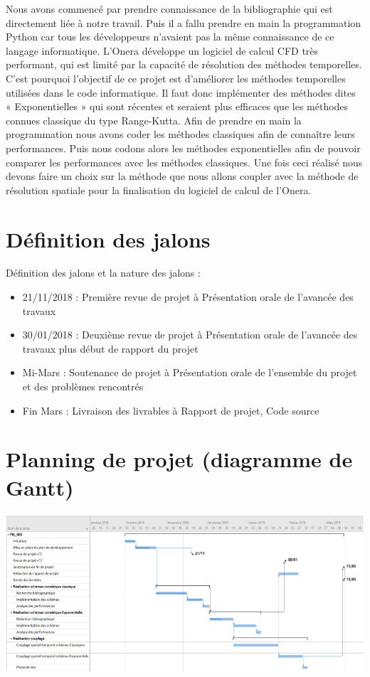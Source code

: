 \documentclass[a4paper,12pt]{report}
\theoremstyle{break}
\begin{document}
    Nous avons commencé par prendre connaissance de la bibliographie qui est directement liée à notre travail. Puis il a fallu prendre en main la programmation Python car tous les développeurs n’avaient pas la même connaissance de ce langage informatique. L’Onera développe un logiciel de calcul CFD très performant, qui est limité par la capacité de résolution des méthodes temporelles. C’est pourquoi l’objectif de ce projet est d’améliorer les méthodes temporelles utilisées dans le code informatique. Il faut donc implémenter des méthodes dites « Exponentielles » qui sont récentes et seraient plus efficaces que les méthodes connues classique du type Range-Kutta. Afin de prendre en main la programmation nous avons coder les méthodes classiques afin de connaître leurs performances. Puis nous codons alors les méthodes exponentielles afin de pouvoir comparer les performances avec les méthodes classiques. Une fois ceci réalisé nous devons faire un choix sur la méthode que nous allons coupler avec la méthode de résolution spatiale pour la finalisation du logiciel de calcul de l’Onera. 

\section{Définition des jalons}

    Définition des jalons et la nature des jalons :
   \begin{itemize}[label=\textbullet]
   	\item 21/11/2018 : Première revue de projet à Présentation orale de l’avancée des travaux
   	\item 30/01/2018 : Deuxième revue de projet à Présentation orale de l’avancée des travaux plus début de rapport du projet
   	\item  Mi-Mars : Soutenance de projet à Présentation orale de l’ensemble du projet et des problèmes rencontrés
   	\item  Fin Mars : Livraison des livrables à Rapport de projet, Code source
    \end{itemize}

\section{Planning de projet (diagramme de Gantt)}

    \begin{center}

    \includegraphics[width=1\textwidth]{images/Gant.png}\\[1cm]

    \end{center} 
\end{document}
